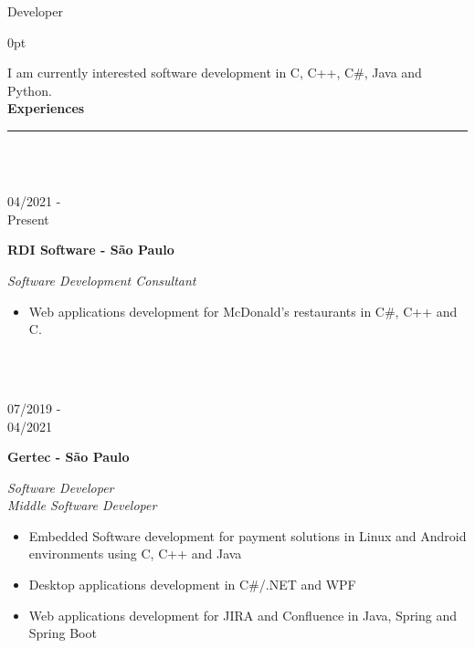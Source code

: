 \documentclass[a4paper]{article}
\begin{document}
	\LARGE Developer
	\vspace{12.5pt}
	\begin{adjustwidth}{\parindent}{0pt}
	\begin{minipage}[t]{0.65\textwidth}
	\large I am currently interested software development in C, C++, C\#, Java and Python.\\

  \Large{\textbf{Experiences}} \normalsize \\ \rule{\textwidth}{0.5pt} \\ \\
  
  \begin{minipage}[t]{0.2\textwidth}
  	\large{04/2021 - \\ Present}
  \end{minipage}
  \begin{minipage}[t]{0.8\textwidth}
  	{
  		\setlength{\parskip}{5.5pt}
  		\Large{\textbf{RDI Software - São Paulo}}
  		
  		\large{\textit{Software Development Consultant}}
  		\begin{itemize}
  			\item \normalsize{Web applications development for McDonald's restaurants in C\#, C++ and C.}
  		\end{itemize}
  	}
  \end{minipage} \\ \\
  
  \begin{minipage}[t]{0.2\textwidth}
    \large{07/2019 - \\ 04/2021}
    \end{minipage}
    \begin{minipage}[t]{0.8\textwidth}
    {
      \setlength{\parskip}{5.5pt}
      \Large{\textbf{Gertec - São Paulo}}
    
      \large{\textit{Software Developer}} \\
      \large{\textit{Middle Software Developer}}
      \begin{itemize}
        \item \normalsize{Embedded Software development for payment solutions in Linux and Android environments using C, C++ and Java}
        \item \normalsize{Desktop applications development in C\#/.NET and WPF}
        \item \normalsize{Web applications development for JIRA and Confluence in Java, Spring and Spring Boot}
      \end{itemize}
    }
  \end{minipage} \\ \\


\end{minipage}
\end{adjustwidth}
\end{document}
